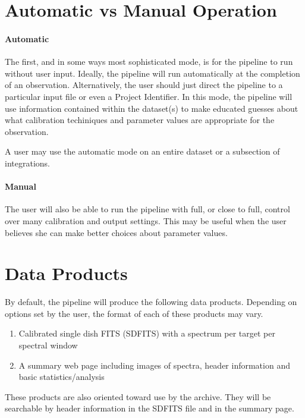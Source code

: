 \documentclass[11pt,twoside]{article}
\begin{document}
\section{Automatic vs Manual Operation}

\paragraph{Automatic}

The first, and in some ways most sophisticated mode, is for the pipeline to run without user input.  Ideally, the pipeline will run automatically at the completion of an observation.  Alternatively, the user should just direct the pipeline to a particular input file or even a Project Identifier.  In this mode, the pipeline will use information contained within the dataset(s) to make educated guesses about what calibration techiniques and parameter values are appropriate for the observation.

A user may use the automatic mode on an entire dataset or a subsection of integrations.

\paragraph{Manual}

The user will also be able to run the pipeline with full, or close to full, control over many calibration and output settings.  This may be useful when the user believes she can make better choices about parameter values.

\section{Data Products}

By default, the pipeline will produce the following data products.  Depending on options set by the user, the format of each of these products may vary.
\begin{enumerate}
\item Calibrated single dish FITS (SDFITS) with a spectrum per target per spectral window
\item A summary web page including images of spectra, header information and basic statistics/analysis
\end{enumerate}

These products are also oriented toward use by the archive.  They will be searchable by header information in the SDFITS file and in the summary page.
\end{document}
